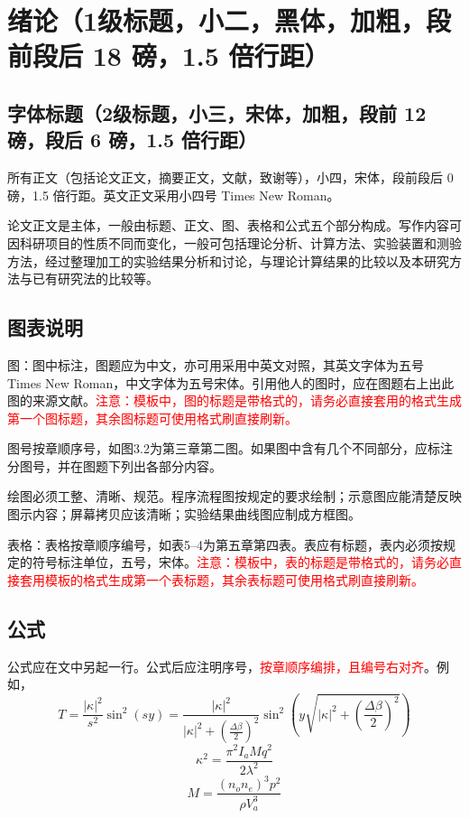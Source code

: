 \chapter{绪论（1级标题，小二，黑体，加粗，段前段后 18 磅，1.5 倍行距）}

\section{字体标题（2级标题，小三，宋体，加粗，段前 12 磅，段后 6 磅，1.5 倍行距）}
所有正文（包括论文正文，摘要正文，文献，致谢等），小四，宋体，段前段后 0 磅，1.5 倍行距。英文正文采用小四号 Times New Roman。

论文正文是主体，一般由标题、正文、图、表格和公式五个部分构成。写作内容可因科研项目的性质不同而变化，一般可包括理论分析、计算方法、实验装置和测验方法，经过整理加工的实验结果分析和讨论，与理论计算结果的比较以及本研究方法与已有研究法的比较等。

\section{图表说明}
图：图中标注，图题应为中文，亦可用采用中英文对照，其英文字体为五号 Times New Roman，中文字体为五号宋体。引用他人的图时，应在图题右上出此图的来源文献。\textcolor{red}{注意：模板中，图的标题是带格式的，请务必直接套用的格式生成第一个图标题，其余图标题可使用格式刷直接刷新。}

图号按章顺序号，如图3.2为第三章第二图。如果图中含有几个不同部分，应标注分图号，并在图题下列出各部分内容。

绘图必须工整、清晰、规范。程序流程图按规定的要求绘制；示意图应能清楚反映图示内容；屏幕拷贝应该清晰；实验结果曲线图应制成方框图。

表格：表格按章顺序编号，如表5--4为第五章第四表。表应有标题，表内必须按规定的符号标注单位，五号，宋体。\textcolor{red}{注意：模板中，表的标题是带格式的，请务必直接套用模板的格式生成第一个表标题，其余表标题可使用格式刷直接刷新。}

\section{公式}
公式应在文中另起一行。公式后应注明序号，\textcolor{red}{按章顺序编排，且编号右对齐}。例如，
\begin{equation}
  T=\frac{\left|\kappa\right|^2}{s^2}\sin^2(sy)=\frac{\left|\kappa\right|^2}{\left|\kappa\right|^2+(\frac{\Delta\beta}{2})^2}\sin^2\left(y\sqrt{\left|\kappa\right|^2+(\frac{\Delta\beta}{2})^2}\right)
\end{equation}
\begin{equation}
  \kappa^2=\frac{\pi^2I_aMq^2}{2\lambda^2}
\end{equation}
\begin{equation}
  M=\frac{(n_on_e)^3p^2}{\rho V_a^3}
\end{equation}

